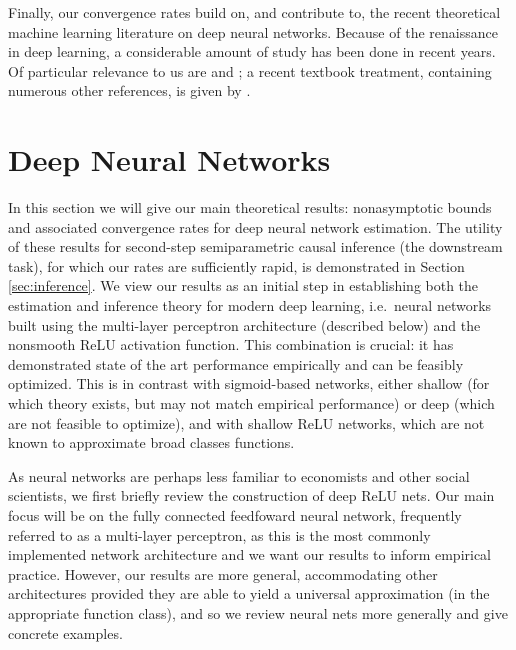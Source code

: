 \documentclass[11pt]{article}
\numberwithin{equation}{section}
\theoremstyle{definition}
\begin{document}
Finally, our convergence rates build on, and contribute to, the recent theoretical machine learning literature on deep neural networks. Because of the renaissance in deep learning, a considerable amount of study has been done in recent years. Of particular relevance to us are \cite{Yarotsky2017_NN, Yarotsky2018_WP} and \cite{Bartlett-etal2017_COLT}; a recent textbook treatment, containing numerous other references, is given by \citet {Goodfellow-Bengio-Courville2016_book}.





\section{Deep Neural Networks}
	\label{sec:deep nets}
	
	
In this section we will give our main theoretical results: nonasymptotic bounds and associated convergence rates for deep neural network estimation. The utility of these results for second-step semiparametric causal inference (the downstream task), for which our rates are sufficiently rapid, is demonstrated in Section \ref{sec:inference}. We view our results as an initial step in establishing both the estimation and inference theory for modern deep learning, i.e.\ neural networks built using the multi-layer perceptron architecture (described below) and the nonsmooth ReLU activation function. This combination is crucial: it has demonstrated state of the art performance empirically and can be feasibly optimized. This is in contrast with sigmoid-based networks, either shallow (for which theory exists, but may not match empirical performance) or deep (which are not feasible to optimize), and with shallow ReLU networks, which are not known to approximate broad classes functions.



As neural networks are perhaps less familiar to economists and other social scientists, we first briefly review the construction of deep ReLU nets. Our main focus will be on the fully connected feedfoward neural network, frequently referred to as a multi-layer perceptron, as this is the most commonly implemented network architecture and we want our results to inform empirical practice. However, our results are more general, accommodating other architectures provided they are able to yield a universal approximation (in the appropriate function class), and so we review neural nets more generally and give concrete examples.
\end{document}
